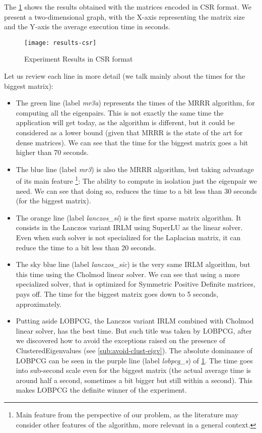 The \cref{fig:exper-csr} shows the results
obtained with the matrices encoded in CSR format. We present a
two-dimensional graph, with the X-axis representing the matrix size
and the Y-axis the average execution time in seconds. 

\begin{figure}[H]
  \centering
  \caption{Experiment Results in CSR format}
  \label{fig:exper-csr}  
  \texttt{[image: results-csr]}
\end{figure}

Let us review each line in more detail (we talk mainly about the times
for the biggest matrix):

\begin{itemize}
\item The green line (label \emph{mr3a}) represents the times of the
  \gls{MRRR} algorithm, for 
  computing all the eigenpairs. This is not exactly the same time
  the application will get today, as the algorithm is different, but
  it could be considered as a lower bound (given that \gls{MRRR} is the
  state of the art for dense matrices). We can see that the time for
  the biggest matrix goes a bit higher than 70 seconds.
\item The blue line (label \emph{mr3}) is also the \gls{MRRR} algorithm, but
  taking advantage of its main feature \footnote{Main feature from the perspective
    of our problem, as the literature may consider other features of
    the algorithm, more relevant in a general context.}: The
  ability to compute in 
  isolation just the eigenpair we need. We can see that doing so,
  reduces the time to a bit less than 30 seconds (for the biggest
  matrix).
\item The orange line (label \emph{lanczos\_si}) is the first sparse
  matrix algorithm. It consists in the Lanczos variant \gls{IRLM}
  using \gls{SuperLU} 
  as the linear solver. Even when such solver is not specialized for
  the \gls{Laplacian} matrix, it can reduce the time to a bit less than 20
  seconds.
  \item The sky blue line (label \emph{lanczos\_sic}) is the very same
    \gls{IRLM} algorithm, but this time using the \gls{Cholmod} linear solver. We
    can see that using a more specialized solver, that is optimized
    for Symmetric Positive Definite matrices, pays off. The time for
    the biggest matrix goes down to 5 seconds, approximately.
  \item Putting aside \gls{LOBPCG}, the Lanczos variant \gls{IRLM}
    combined with \gls{Cholmod} linear solver, has the best time. But
    such title was taken by \gls{LOBPCG}, after we discovered how to
    avoid the exceptions raised on the presence of
    \gls{ClusteredEigenvalues} (see \cref{sub:avoid-clust-eigv}). The
    absolute dominance of \gls{LOBPCG} can be seen in the  
    purple  line (label \emph{lobpcg\_s}) of \cref{fig:exper-csr}. The time 
    goes into sub-second scale even for the biggest matrix (the actual
    average time is around half a second, sometimes a bit bigger but
    still within a second). This makes \gls{LOBPCG} the definite winner of
    the experiment. 
\end{itemize}

